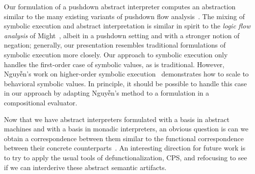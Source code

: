 Our formulation of a pushdown abstract interpreter computes an abstraction
similar to the many existing variants of pushdown flow analysis~\cite%
{dvanhorn:Vardoulakis2011CFA2%
,dvanhorn:Earl2010Pushdown%
,local:vardoulakis-diss12%
,dvanhorn:VanHorn2012Systematic%
,dvanhorn:Earl2012Introspective%
,dvanhorn:Johnson2014Abstracting%
,dvanhorn:Johnson2014Pushdown%
,local:p4f%
}.
The mixing of symbolic execution and abstract interpretation is similar in
spirit to the \emph{logic flow analysis} of Might~\cite{local:might-popl07},
albeit in a pushdown setting and with a stronger notion of negation; generally,
our presentation resembles traditional formulations of symbolic execution more
closely.  Our approach to symbolic execution only handles the first-order case
of symbolic values, as is traditional.  However, Nguyễn's work on higher-order
symbolic execution~\cite{dvanhorn:Nguyen2015Relatively} demonstrates how to
scale to behavioral symbolic values.  In principle, it should be possible to
handle this case in our approach by adapting Nguyễn's method to a formulation
in a compositional evaluator.

Now that we have abstract interpreters formulated with a basis in abstract
machines and with a basis in monadic interpreters, an obvious question is can
we obtain a correspondence between them similar to the functional
correspondence between their concrete
counterparts~\cite{dvanhorn:Ager2005Functional}.  An interesting direction for
future work is to try to apply the usual tools of defunctionalization, CPS, and
refocusing to see if we can interderive these abstract semantic artifacts.
